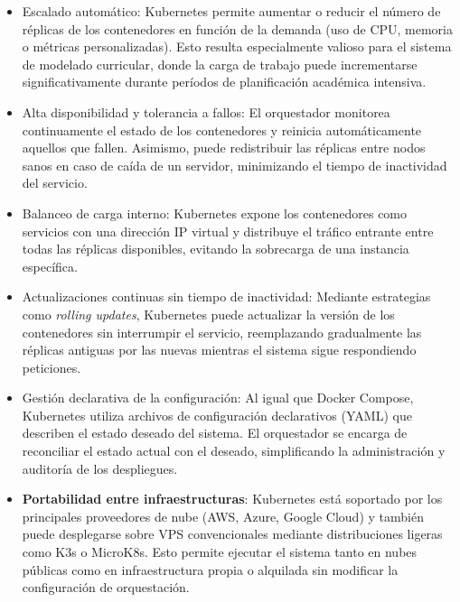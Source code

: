 \begin{itemize}
    \item Escalado automático: Kubernetes permite aumentar o reducir el número 
    de réplicas de los contenedores en función de la demanda (uso de CPU, memoria o 
    métricas personalizadas). Esto resulta especialmente valioso para el sistema de 
    modelado curricular, donde la carga de trabajo puede incrementarse 
    significativamente durante períodos de planificación académica intensiva.
    
    \item Alta disponibilidad y tolerancia a fallos: El orquestador monitorea 
    continuamente el estado de los contenedores y reinicia automáticamente aquellos 
    que fallen. Asimismo, puede redistribuir las réplicas entre nodos sanos en caso 
    de caída de un servidor, minimizando el tiempo de inactividad del servicio.
    
    \item Balanceo de carga interno: Kubernetes expone los contenedores como 
    servicios con una dirección \ac{IP} virtual y distribuye el tráfico entrante entre 
    todas las réplicas disponibles, evitando la sobrecarga de una instancia específica.
    
    \item Actualizaciones continuas sin tiempo de inactividad: Mediante 
    estrategias como \textit{rolling updates}, Kubernetes puede actualizar la versión 
    de los contenedores sin interrumpir el servicio, reemplazando gradualmente las 
    réplicas antiguas por las nuevas mientras el sistema sigue respondiendo peticiones.
    
    \item Gestión declarativa de la configuración: Al igual que Docker Compose, 
    Kubernetes utiliza archivos de configuración declarativos (YAML) que describen el 
    estado deseado del sistema. El orquestador se encarga de reconciliar el estado 
    actual con el deseado, simplificando la administración y auditoría de los 
    despliegues.
    
    \item \textbf{Portabilidad entre infraestructuras}: Kubernetes está soportado por los 
    principales proveedores de nube (AWS, Azure, Google Cloud) y también puede desplegarse sobre 
    \ac{VPS} convencionales mediante distribuciones ligeras como K3s o MicroK8s. 
    Esto permite ejecutar el sistema tanto en nubes públicas como en infraestructura propia o alquilada sin 
    modificar la configuración de orquestación.
\end{itemize}

